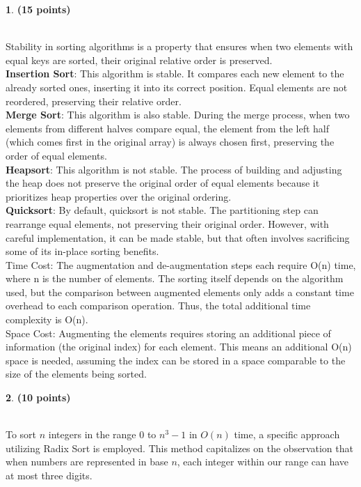 \documentclass[11pt]{article}
\theoremstyle{definition}
\newtheorem{prob}{}
\newcommand{\solution}{\medskip\noindent{\color{DarkBlue}\textbf{Solution:}}}
\begin{document}
\begin{prob} \textbf{(15 points)}
\end{prob}
\solution \\

Stability in sorting algorithms is a property that ensures when two elements with equal keys are sorted, their original relative order is preserved.
\\
\textbf{Insertion Sort}: This algorithm is stable. It compares each new element to the already sorted ones, inserting it into its correct position. Equal elements are not reordered, preserving their relative order.
\\
\textbf{Merge Sort}: This algorithm is also stable. During the merge process, when two elements from different halves compare equal, the element from the left half (which comes first in the original array) is always chosen first, preserving the order of equal elements.
\\
\textbf{Heapsort}: This algorithm is not stable. The process of building and adjusting the heap does not preserve the original order of equal elements because it prioritizes heap properties over the original ordering.
\\
\textbf{Quicksort}: By default, quicksort is not stable. The partitioning step can rearrange equal elements, not preserving their original order. However, with careful implementation, it can be made stable, but that often involves sacrificing some of its in-place sorting benefits.
\\

Time Cost: The augmentation and de-augmentation steps each require O(n) time, where n is the number of elements. The sorting itself depends on the algorithm used, but the comparison between augmented elements only adds a constant time overhead to each comparison operation. Thus, the total additional time complexity is O(n).
\\

Space Cost: Augmenting the elements requires storing an additional piece of information (the original index) for each element. This means an additional O(n) space is needed, assuming the index can be stored in a space comparable to the size of the elements being sorted.
\begin{prob} \textbf{(10 points)}
\end{prob}
\solution \\

To sort \(n\) integers in the range \(0\) to \(n^3 - 1\) in \(O(n)\) time, a specific approach utilizing Radix Sort is employed. This method capitalizes on the observation that when numbers are represented in base \(n\), each integer within our range can have at most three digits.
\end{document}
